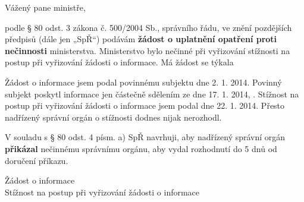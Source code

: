 \documentclass[11pt,a4paper,czech]{article}
\begin{document}


\def \yourdate {17. 1. 2014}
\def \place {Praha}

\printheader

\subject{Žádost o uplatnění opatření proti nečinnosti Ministerstva kultury}

Vážený pane ministře,

podle § 80 odst. 3 zákona č. 500/2004 Sb., správního řádu, ve znění pozdějších předpisů (dále jen „SpŘ“) podávám {\bf žádost o uplatnění opatření proti nečinnosti} ministerstva. Ministerstvo bylo nečinné při vyřizování stížnosti na postup při vyřizování žádosti o informace. Má žádost se týkala {\emph \casename} 

Žádost o informace jsem podal povinnému subjektu  dne 2. 1. 2014. Povinný subjekt poskytl informace jen částečně sdělením ze dne {\yourdate}, {\yoursign}. Stížnost na postup při vyřizování žádosti o informace jsem podal dne 22. 1. 2014. Přesto nadřízený správní orgán o stížnosti dodnes nijak nerozhodl. 

V souladu s § 80 odst. 4 písm. a) SpŘ navrhuji, aby nadřízený správní orgán {\bf přikázal} nečinnému správnímu orgánu, aby vydal rozhodnutí do 5 dnů od doručení příkazu. 

\signature{S úctou

\bigskip
{}}

\attachments

Žádost o informace \\
Stížnost na postup při vyřizování žádosti o informace
\end{document}
